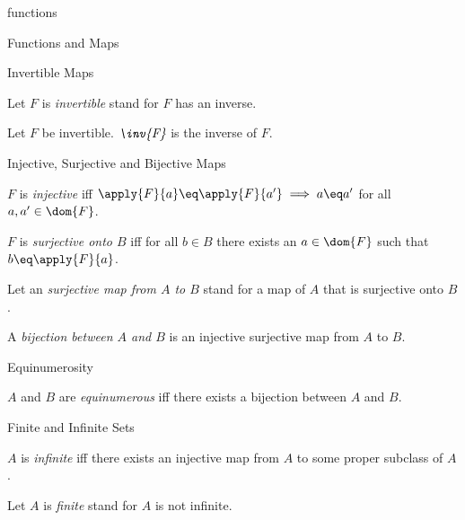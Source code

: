 \documentclass{naproche-library}
\begin{document}
\begin{smodule}{functions}
\begin{sfragment}{Functions and Maps}
\begin{sfragment}{Invertible Maps}
\begin{definition*}[forthel,id=InvertibleDef]
      Let $F$ is \emph{invertible} stand for $F$ has an inverse.
    \end{definition*}

    \begin{definition*}[forthel,id=InverseMapDef]
      Let $F$ be invertible.
      $\emph{\inv{F}}$ is the inverse of $F$.
    \end{definition*}
  \end{sfragment}

  \begin{sfragment}{Injective, Surjective and Bijective Maps}
    \begin{definition*}[forthel,id=InjectionDef]
      $F$ is \emph{injective} iff $\apply{F}{a}\eq\apply{F}{a'}\implies a\eq a'$ for all $a,a'\in\dom{F}$.
    \end{definition*}

    \begin{definition*}[forthel,id=SurjectionDef]
      $F$ is \emph{surjective onto $B$} iff for all $b\in B$ there exists an $a\in\dom{F}$ such that $b\eq \apply{F}{a}$.

      Let an \emph{surjective map from $A$ to $B$} stand for a map of $A$ that is surjective onto $B$.
    \end{definition*}

    \begin{definition*}[forthel,id=BijectionDef]
      A \emph{bijection between $A$ and $B$} is an injective surjective map from $A$ to $B$.
    \end{definition*}
  \end{sfragment}

  \begin{sfragment}{Equinumerosity}
    \begin{definition*}[forthel,id=EquinumerousDef]
      $A$ and $B$ are \emph{equinumerous} iff there exists a bijection between $A$ and $B$.
    \end{definition*}
  \end{sfragment}

  \begin{sfragment}{Finite and Infinite Sets}
    \begin{definition*}[forthel,id=InfiniteDef]
      $A$ is \emph{infinite} iff there exists an injective map from $A$ to some proper subclass of $A$.

      Let $A$ is \emph{finite} stand for $A$ is not infinite.
    \end{definition*}
  \end{sfragment}
\end{sfragment}
\end{smodule}
\end{document}
